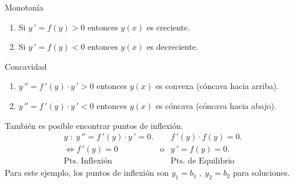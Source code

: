 \documentclass{beamer}
\begin{document}
\begin{frame}[t]
	\vspace{-4mm}
	\begin{block}{Monotonía}
		\begin{enumerate}
			\item Si \(y\,' =f(y) >0\) entonces \(y(x)\) es creciente.
			\item Si \(y\,' =f(y) <0\) entonces \(y(x)\) es decreciente.
		\end{enumerate}
	\end{block}
	\vspace{-2mm}
	\begin{block}{Concavidad}
		\begin{enumerate}
			\item \(y\,'' =f\,' (y) \cdot y\,' >0\) entonces \(y(x)\) es convexa (cóncava hacia arriba).
			\item \(y\,'' =f\,' (y) \cdot y\,' <0\) entonces \(y(x)\) es cóncava (cóncava hacia abajo).
		\end{enumerate}
	\end{block}
	\vspace{-2mm}
	También es posible encontrar puntos de inflexión.
	\[
		\begin{array}{rcl}
			y \;:\; y\,'' = f\,'(y) \cdot y\,' =0. && f\,' (y) \cdot f(y) =0. \\[2mm]
			\iff f\,' (y) =0 & \mbox{o} & y\,' =f(y) =0. \\[2mm]
			\mbox{Pts. Inflexión} && \mbox{Pts. de Equilibrio}
		\end{array}
	\]
	Para este ejemplo, los puntos de inflexión son \(y_1=b_1 \;,\; y_2=b_2\) para soluciones.
\end{frame}
\end{document}
